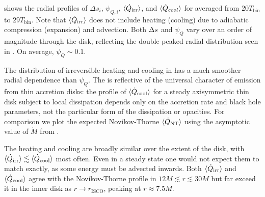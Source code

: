  shows the radial profiles of $\Delta s_i$, $\psi_{Q,i}$, $\langle \dot{Q}_\text{irr} \rangle$, and $\langle \dot{Q}_{cool} \rangle$ for  averaged from $20 T_\text{bin}$ to $29 T_\text{bin}$.  Note that $\langle \dot{Q}_\text{irr} \rangle$ does not include heating (cooling) due to adiabatic compression (expansion) and advection.  Both $\Delta s$ and $\psi_Q$ vary over an order of magnitude through the disk, reflecting the double-peaked radial distribution seen in . On average, $\psi_Q \sim 0.1$.  

The distribution of irreversible heating and cooling in  has a much smoother radial dependence than $\psi_Q$. The is reflective of the universal character of emission from thin accretion disks: the profile of $\langle \dot{Q}_\text{cool} \rangle$ for a steady axisymmetric thin disk subject to local dissipation depends only on the accretion rate and black hole parameters, not the particular form of the dissipation or opacities.  For comparison we plot the expected Novikov-Thorne $\langle \dot{Q}_\text{NT} \rangle$ using the asymptotic value of $\dot{M}$ from . 

The heating and cooling are broadly similar over the extent of the disk, with $\langle \dot{Q}_\text{irr} \rangle \lesssim \langle \dot{Q}_\text{cool} \rangle$ most often.  Even in a steady state one would not expect them to match exactly, as some energy must be advected inwards.  Both $\langle \dot{Q}_\text{irr} \rangle$ and $\langle \dot{Q}_\text{cool} \rangle$ agree with the Novikov-Thorne profile in $12 M \lesssim r \lesssim 30M$ but far exceed it in the inner disk as $r \to r_\text{ISCO}$, peaking at $r \approx 7.5M$.

